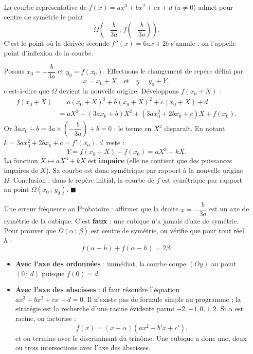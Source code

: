 \documentclass[11pt]{article}
\newcommand{\cle}[1]{{\popxbold\color{popdark}#1}}
\newcounter{popsec}
\newcounter{popsub}
\newcommand{\courssub}[1]{%
  \stepcounter{popsub}%
  \par\vspace{9pt}\noindent{\popxbold\fontsize{11.5}{13}\selectfont\color{popink}{\color{poporange}\thepopsec.\thepopsub}\hspace{6pt}#1}\par\nopagebreak\vspace{4pt}
}
\begin{document}
\begin{propriete}
La courbe représentative de $f(x) = ax^3 + bx^2 + cx + d$ ($a \neq 0$) admet pour \cle{centre de symétrie} le point
\[ \Omega\left(-\frac{b}{3a}\,;\, f\left(-\frac{b}{3a}\right)\right). \]
C'est le point où la dérivée seconde $f''(x) = 6ax + 2b$ s'annule : on l'appelle \cle{point d'inflexion} de la courbe.
\end{propriete}

\begin{experience}
Posons $x_0 = -\dfrac{b}{3a}$ et $y_0 = f(x_0)$. Effectuons le changement de repère défini par
\[ x = x_0 + X \quad \text{et} \quad y = y_0 + Y, \]
c'est-à-dire que $\Omega$ devient la nouvelle origine. Développons $f(x_0 + X)$ :
\begin{align*}
f(x_0 + X) &= a(x_0 + X)^3 + b(x_0 + X)^2 + c(x_0 + X) + d \\
&= aX^3 + (3ax_0 + b)X^2 + \left(3ax_0^2 + 2bx_0 + c\right)X + f(x_0).
\end{align*}
Or $3ax_0 + b = 3a \times \left(-\dfrac{b}{3a}\right) + b = 0$ : le terme en $X^2$ disparaît. En notant $k = 3ax_0^2 + 2bx_0 + c = f'(x_0)$, il reste :
\[ Y = f(x_0 + X) - f(x_0) = aX^3 + kX. \]
La fonction $X \mapsto aX^3 + kX$ est \textbf{impaire} (elle ne contient que des puissances impaires de $X$). Sa courbe est donc symétrique par rapport à la nouvelle origine $\Omega$. Conclusion : dans le repère initial, la courbe de $f$ est symétrique par rapport au point $\Omega(x_0\,;\,y_0)$. $\blacksquare$
\end{experience}

\begin{attention}
Une erreur fréquente au Probatoire : affirmer que la droite $x = -\dfrac{b}{3a}$ est un axe de symétrie de la cubique. C'est \textbf{faux} : une cubique n'a jamais d'axe de symétrie. Pour prouver que $\Omega(\alpha\,;\,\beta)$ est centre de symétrie, on vérifie que pour tout réel $h$ :
\[ f(\alpha + h) + f(\alpha - h) = 2\beta. \]
\end{attention}

\courssub{Intersections avec les axes}

\begin{itemize}
\item \textbf{Avec l'axe des ordonnées} : immédiat, la courbe coupe $(Oy)$ au point $(0\,;\,d)$ puisque $f(0) = d$.
\item \textbf{Avec l'axe des abscisses} : il faut résoudre l'équation $ax^3 + bx^2 + cx + d = 0$. Il n'existe pas de formule simple au programme ; la stratégie est la recherche d'une \cle{racine évidente} parmi $-2, -1, 0, 1, 2$. Si $\alpha$ est racine, on factorise :
\[ f(x) = (x - \alpha)(ax^2 + b'x + c'), \]
et on termine avec le discriminant du trinôme. Une cubique a donc une, deux ou trois intersections avec l'axe des abscisses.
\end{itemize}
\end{document}
